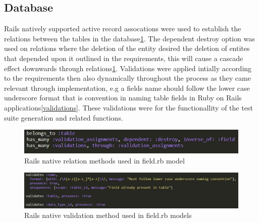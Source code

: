 \documentclass[a4paper,12pt]{article}
\begin{document}
\subsection{Database}

\par Rails natively supported active record assocations were used to establish the relations between the tables in the database\cite{railsara}\ref{fig:relations}. The dependent destroy option was used on relations where the deletion of the entity desired the deletion of entites that depended upon it outlined in the requirements, this will cause a cascade effect downwards through relations\ref{fig:relations}. Validations were applied intially according to the requirements then also dynamically throughout the process as they came relevant through implementation, e.g a fields name should follow the lower case underscore format that is convention in naming table fields in Ruby on Rails applications\ref{validations}. These validations were for the functionallity of the test suite generation and related functions.
\begin{figure}
\includegraphics[width=\linewidth]{screenshots/relations}
\caption{Rails native relation methods used in field.rb model}
\label{fig:relations}
\end{figure}

\begin{figure}
\includegraphics[width=\linewidth]{screenshots/validations}
\caption{Rails native validation method used in field.rb models}
\label{fig:validations}
\end{figure}
\end{document}

